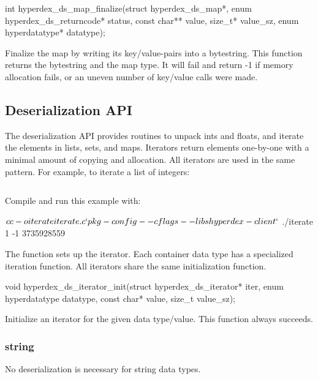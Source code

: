 \funcsep
\begin{ccode}
int hyperdex_ds_map_finalize(struct hyperdex_ds_map*,
                             enum hyperdex_ds_returncode* status,
                             const char** value, size_t* value_sz,
                             enum hyperdatatype* datatype);
\end{ccode}
\funcdesc Finalize the map by writing its key/value-pairs  into a bytestring.
This function returns the bytestring and the map type.  It will fail and return
-1 if memory allocation fails, or an uneven number of key/value calls were made.

\subsection{Deserialization API}

The deserialization API provides routines to unpack ints and floats, and iterate
the elements in lists, sets, and maps.  Iterators return elements one-by-one
with a minimal amount of copying and allocation.  All iterators are used in the
same pattern.  For example, to iterate a list of integers:

\inputminted{c}{api/c/iterate.c}

Compile and run this example with:

\begin{consolecode}
$ cc -o iterate iterate.c `pkg-config --cflags --libs hyperdex-client`
$ ./iterate
1
-1
3735928559
\end{consolecode}

The function  sets up the iterator.  Each
container data type has a specialized iteration function.  All iterators share
the same initialization function.

\begin{ccode}
void hyperdex_ds_iterator_init(struct hyperdex_ds_iterator* iter,
                               enum hyperdatatype datatype,
                               const char* value,
                               size_t value_sz);
\end{ccode}
\funcdesc Initialize an iterator for the given data type/value.  This function
always succeeds.

\subsubsection{string}

No deserialization is necessary for string data types.

